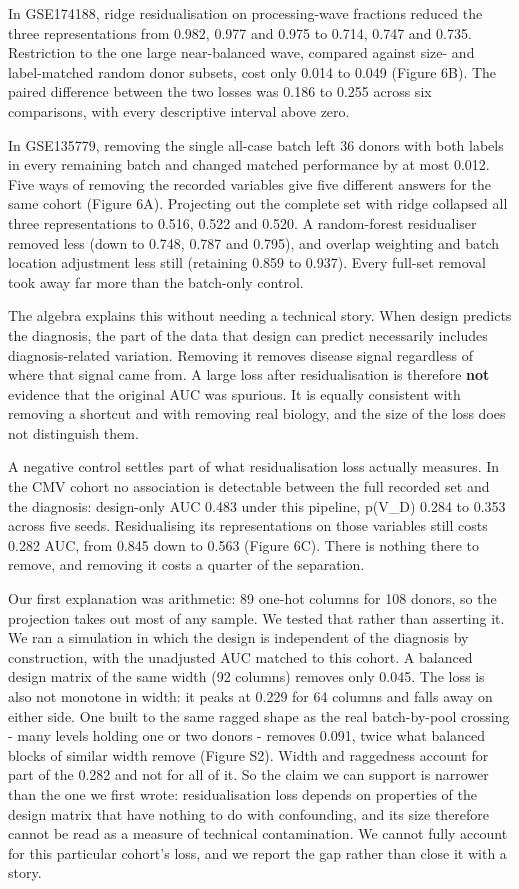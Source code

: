 In GSE174188, ridge residualisation on processing-wave fractions reduced the three representations from 0.982, 0.977 and 0.975 to 0.714, 0.747 and 0.735. Restriction to the one large near-balanced wave, compared against size- and label-matched random donor subsets, cost only 0.014 to 0.049 (Figure 6B). The paired difference between the two losses was 0.186 to 0.255 across six comparisons, with every descriptive interval above zero.

In GSE135779, removing the single all-case batch left 36 donors with both labels in every remaining batch and changed matched performance by at most 0.012. Five ways of removing the recorded variables give five different answers for the same cohort (Figure 6A). Projecting out the complete set with ridge collapsed all three representations to 0.516, 0.522 and 0.520. A random-forest residualiser removed less (down to 0.748, 0.787 and 0.795), and overlap weighting and batch location adjustment less still (retaining 0.859 to 0.937). Every full-set removal took away far more than the batch-only control.

The algebra explains this without needing a technical story. When design predicts the diagnosis, the part of the data that design can predict necessarily includes diagnosis-related variation. Removing it removes disease signal regardless of where that signal came from. A large loss after residualisation is therefore \textbf{not} evidence that the original AUC was spurious. It is equally consistent with removing a shortcut and with removing real biology, and the size of the loss does not distinguish them.

A negative control settles part of what residualisation loss actually measures. In the CMV cohort no association is detectable between the full recorded set and the diagnosis: design-only AUC 0.483 under this pipeline, p(V\_D) 0.284 to 0.353 across five seeds. Residualising its representations on those variables still costs 0.282 AUC, from 0.845 down to 0.563 (Figure 6C). There is nothing there to remove, and removing it costs a quarter of the separation.

Our first explanation was arithmetic: 89 one-hot columns for 108 donors, so the projection takes out most of any sample. We tested that rather than asserting it. We ran a simulation in which the design is independent of the diagnosis by construction, with the unadjusted AUC matched to this cohort. A balanced design matrix of the same width (92 columns) removes only 0.045. The loss is also not monotone in width: it peaks at 0.229 for 64 columns and falls away on either side. One built to the same ragged shape as the real batch-by-pool crossing - many levels holding one or two donors - removes 0.091, twice what balanced blocks of similar width remove (Figure S2). Width and raggedness account for part of the 0.282 and not for all of it. So the claim we can support is narrower than the one we first wrote: residualisation loss depends on properties of the design matrix that have nothing to do with confounding, and its size therefore cannot be read as a measure of technical contamination. We cannot fully account for this particular cohort's loss, and we report the gap rather than close it with a story.

